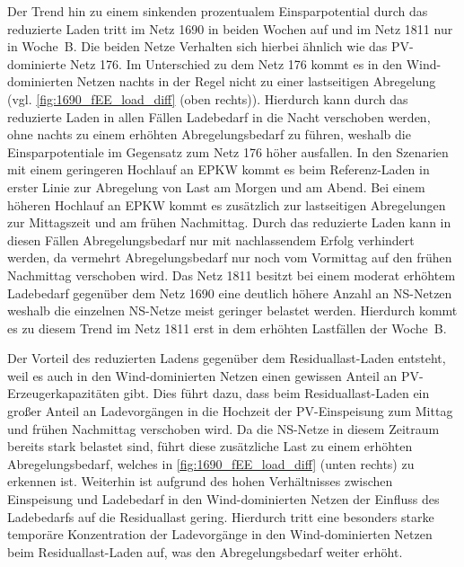 

Der Trend hin zu einem sinkenden prozentualem Einsparpotential durch das reduzierte Laden tritt im Netz \num{1690} in beiden Wochen auf und im Netz \num{1811} nur in Woche~B.
Die beiden Netze Verhalten sich hierbei ähnlich wie das \gls{PV}-dominierte Netz \num{176}.
Im Unterschied zu dem Netz \num{176} kommt es in den Wind-dominierten Netzen nachts in der Regel nicht zu einer lastseitigen Abregelung (vgl. \autoref{fig:1690_fEE_load_diff} (oben rechts)).
Hierdurch kann durch das reduzierte Laden in allen Fällen Ladebedarf in die Nacht verschoben werden, ohne nachts zu einem erhöhten Abregelungsbedarf zu führen, weshalb die Einsparpotentiale im Gegensatz zum Netz \num{176} höher ausfallen.
In den Szenarien mit einem geringeren Hochlauf an \gls{EPKW} kommt es beim Referenz-Laden in erster Linie zur Abregelung von Last am Morgen und am Abend.
Bei einem höheren Hochlauf an \gls{EPKW} kommt es zusätzlich zur lastseitigen Abregelungen zur Mittagszeit und am frühen Nachmittag.
Durch das reduzierte Laden kann in diesen Fällen Abregelungsbedarf nur mit nachlassendem Erfolg verhindert werden, da vermehrt Abregelungsbedarf nur noch vom Vormittag auf den frühen Nachmittag verschoben wird.
Das Netz \num{1811} besitzt bei einem moderat erhöhtem Ladebedarf gegenüber dem Netz \num{1690} eine deutlich höhere Anzahl an \gls{NS}-Netzen weshalb die einzelnen \gls{NS}-Netze meist geringer belastet werden.
Hierdurch kommt es zu diesem Trend im Netz \num{1811} erst in dem erhöhten Lastfällen der Woche~B.



Der Vorteil des reduzierten Ladens gegenüber dem Residuallast-Laden entsteht, weil es auch in den Wind-dominierten Netzen einen gewissen Anteil an \gls{PV}-Erzeugerkapazitäten gibt.
Dies führt dazu, dass beim Residuallast-Laden ein großer Anteil an Ladevorgängen in die Hochzeit der \gls{PV}-Einspeisung zum Mittag und frühen Nachmittag verschoben wird.
Da die \gls{NS}-Netze in diesem Zeitraum bereits stark belastet sind, führt diese zusätzliche Last zu einem erhöhten Abregelungsbedarf, welches in \autoref{fig:1690_fEE_load_diff} (unten rechts) zu erkennen ist.
Weiterhin ist aufgrund des hohen Verhältnisses zwischen Einspeisung und Ladebedarf in den Wind-dominierten Netzen der Einfluss des Ladebedarfs auf die Residuallast gering.
Hierdurch tritt eine besonders starke temporäre Konzentration der Ladevorgänge in den Wind-dominierten Netzen beim Residuallast-Laden auf, was den Abregelungsbedarf weiter erhöht.

